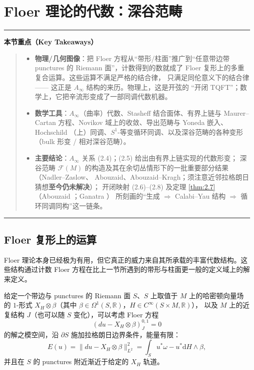 \documentclass[UTF8,a4paper,11pt,fontset=windows]{ctexart}
\theoremstyle{cnthm}
\numberwithin{equation}{section}
\newenvironment{keytake}%
  {\par\medskip\noindent\rule{\linewidth}{0.5pt}\par\nopagebreak\vspace{3pt}%
   \noindent\textbf{本节重点（Key Takeaways）}\par\nopagebreak\vspace{2pt}%
   \begingroup\setlength{\topsep}{0pt}\setlength{\partopsep}{0pt}%
   \begin{quote}\small\setlength{\itemsep}{2pt}\setlength{\parskip}{0pt}}%
  {\end{quote}\endgroup\vspace{1pt}\noindent\rule{\linewidth}{0.5pt}\par\medskip}
\newcommand{\R}{\mathbb{R}}
\newcommand{\FF}{\mathcal{F}}         %
\begin{document}
\section{Floer 理论的代数：深谷范畴}

\begin{keytake}
\begin{itemize}[leftmargin=1.3em,itemsep=2pt,topsep=0pt]
  \item \textbf{物理/几何图像}：把 Floer 方程从“带形/柱面”推广到“任意带边带 punctures 的
        Riemann 面”，计数得到的数就成了 Floer 复形上的多重复合运算。这些运算不满足严格的结合律，
        只满足同伦意义下的结合律 —— 这正是 $A_\infty$ 结构的来历。物理上，这是开弦的
        “开闭 TQFT”；数学上，它把辛流形变成了一部同调代数机器。
  \item \textbf{数学工具}：$A_\infty$（曲率）代数、Stasheff 结合面体、有界上链与
        Maurer--Cartan 方程、Novikov 域上的收敛、导出范畴与 Yoneda 嵌入、Hochschild
        （上）同调、$S^1$-等变循环同调、以及深谷范畴的各种变形（bulk 形变 / 相对深谷范畴）。
  \item \textbf{主要结论}：$A_\infty$ 关系 (2.4)；(2.5) 给出由有界上链实现的代数形变；
        深谷范畴 $\FF(M)$ 的构造及其在余切丛情形下的一批重要部分结果（Nadler--Zaslow、
        Abouzaid、Abouzaid--Kragh；须注意近邻拉格朗日猜想\textbf{至今仍未解决}）；
        开闭映射 (2.6)--(2.8) 及定理 \ref{thm:2.7}（Abouzaid \cite{r1}；Ganatra \cite{r52,r53}）
        所刻画的“生成 $\Rightarrow$ Calabi--Yau 结构 $\Rightarrow$ 循环同调同构”这一链条。
\end{itemize}
\end{keytake}

\subsection{Floer 复形上的运算}\label{sec:2.1}

Floer 理论本身已经极为有用，但它真正的威力来自其所承载的丰富代数结构。这些结构通过计数
Floer 方程在比上一节所遇到的带形与柱面更一般的定义域上的解来定义。

给定一个带边与 punctures 的 Riemann 面 $S$、$S$ 上取值于 $M$ 上的哈密顿向量场的 $1$-形式
$X_H\otimes\beta$（其中 $\beta\in\Omega^{1}(S,\R)$，$H\in C^{\infty}(S\times M,\R)$），
以及 $M$ 上的近复结构 $J$（也可以随 $S$ 变化），可以考虑 Floer 方程
\begin{equation}\label{eq:2.1}
(du-X_H\otimes\beta)^{0,1}_{J}=0
\end{equation}
的解之模空间，沿 $\partial S$ 施加拉格朗日边界条件，能量有限：
\begin{equation}\label{eq:2.2}
E(u)=\bigl\|du-X_H\otimes\beta\bigr\|^{2}_{L^{2}}=\int_{S}u^{*}\omega-u^{*}\mathrm{d}H\wedge\beta,
\end{equation}
并且在 $S$ 的 punctures 附近渐近于给定的 $X_H$ 轨道。
\end{document}
